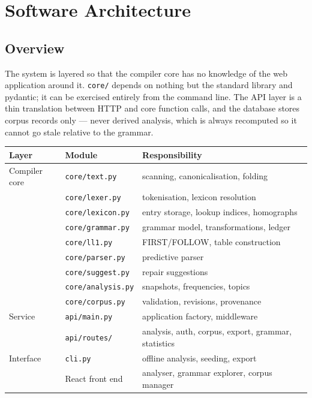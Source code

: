 \section{Software Architecture}\label{sec:architecture}

\subsection{Overview}


The system is layered so that the compiler core has no knowledge of the web application
around it. \texttt{core/} depends on nothing but the standard library and pydantic; it can
be exercised entirely from the command line. The API layer is a thin translation between
HTTP and core function calls, and the database stores corpus records only --- never derived
analysis, which is always recomputed so it cannot go stale relative to the grammar.

\begin{center}
\begin{tabular}{@{}lll@{}}
\toprule
\textbf{Layer} & \textbf{Module} & \textbf{Responsibility} \\
\midrule
Compiler core & \texttt{core/text.py}     & scanning, canonicalisation, folding \\
              & \texttt{core/lexer.py}    & tokenisation, lexicon resolution \\
              & \texttt{core/lexicon.py}  & entry storage, lookup indices, homographs \\
              & \texttt{core/grammar.py}  & grammar model, transformations, ledger \\
              & \texttt{core/ll1.py}      & FIRST/FOLLOW, table construction \\
              & \texttt{core/parser.py}   & predictive parser \\
              & \texttt{core/suggest.py}  & repair suggestions \\
              & \texttt{core/analysis.py} & snapshots, frequencies, topics \\
              & \texttt{core/corpus.py}   & validation, revisions, provenance \\
\midrule
Service       & \texttt{api/main.py}      & application factory, middleware \\
              & \texttt{api/routes/}      & analysis, auth, corpus, export, grammar, statistics \\
\midrule
Interface     & \texttt{cli.py}           & offline analysis, seeding, export \\
              & React front end           & analyser, grammar explorer, corpus manager \\
\bottomrule
\end{tabular}
\end{center}

